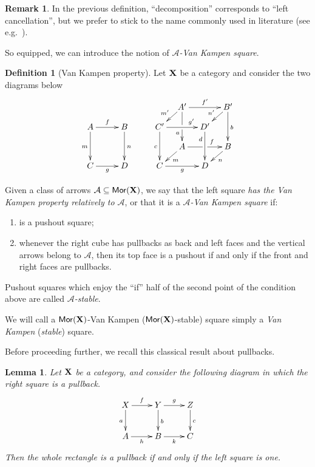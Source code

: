 \documentclass[a4paper]{article}
\newcommand{\mor}{\mathsf{Mor}}
\def\C{\textbf {\textup{C}}}
\def\X{\textbf {\textup{X}}}
\newtheorem{lemma}[theorem]{Lemma}
\theoremstyle{definition}
\newtheorem{definition}[theorem]{Definition}
\newtheorem{remark}[theorem]{Remark}
\begin{document}
\begin{remark}In the previous definition, ``decomposition'' corresponds to ``left cancellation'', but we prefer to stick to the name commonly used in literature (see e.g.~\cite{habel2012mathcal}).
\end{remark}


So equipped, we can introduce the notion of \emph{$\mathcal{A}$-Van Kampen square}.
\begin{definition}[Van Kampen property] Let $\X$ be a category  and consider the two diagrams below
	\[\xymatrix@C=10pt@R=10pt{&&&&&A'\ar[dd]|\hole_(.65){a}\ar[rr]^{f'} \ar[dl]_{m'} && B' \ar[dd]^{b} \ar[dl]_{n'} \\ A \ar[dd]_{m}\ar[rr]^{f}&&B\ar[dd]^{n}&&C'  \ar[dd]_{c}\ar[rr]^(.7){g'} & & D' \ar[dd]_(.3){d}\\&&&&&A\ar[rr]|\hole^(.65){f} \ar[dl]^{m} && B \ar[dl]^{n} \\C\ar[rr]_{g} &&D&&C \ar[rr]_{g} & & D}\]
	
	Given  a class of arrows $\mathcal{A}\subseteq \mor(\X)$, we say that the left square \emph{has the Van Kampen property relatively to $\mathcal{A}$}, or that it  is a \emph{$\mathcal{A}$-Van Kampen square} if:
	\begin{enumerate}
		\item is a pushout square;
		\item 	whenever the right cube has pullbacks as back and left faces and the vertical arrows belong to $\mathcal{A}$, then its top face is a pushout if and only if the front and right faces are pullbacks.
	\end{enumerate}
	Pushout squares which enjoy the ``if'' half of the second point of the condition above are called \emph{$\mathcal{A}$-stable}. 
	
We will call a $\mor(\X)$-Van Kampen ($\mor(\X)$-stable) square simply a \emph{Van Kampen} (\emph{stable}) square.
\end{definition}

Before proceeding further, we recall this classical result about pullbacks.

\begin{lemma}\label{lem:pb1}
	Let $\X$ be a category, and consider the following diagram 	in which the right square is a pullback.
	\[\xymatrix{X \ar[d]_{a} \ar[r]^{f}& \ar[r]^{g} Y \ar[d]^{b}& Z \ar[d]^{c}\\ A \ar[r]_{h}& B \ar[r]_{k}& C}\]
	Then the whole rectangle is a pullback if and only if the left square is one.
\end{lemma}
\end{document}
